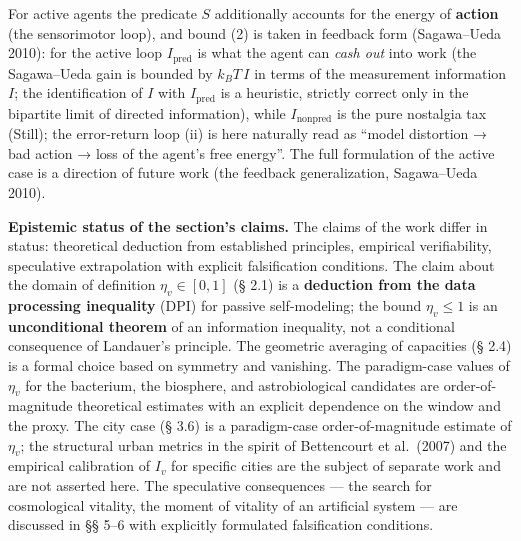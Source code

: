 \documentclass[pdflatex,sn-mathphys-ay]{sn-jnl}
\begin{document}
For active agents the predicate \(S\) additionally accounts for the energy of \textbf{action} (the sensorimotor loop), and bound (2) is taken in feedback form (Sagawa--Ueda 2010): for the active loop \(I_{\text{pred}}\) is what the agent can \emph{cash out} into work (the Sagawa--Ueda gain is bounded by \(k_B T\,I\) in terms of the measurement information \(I\); the identification of \(I\) with \(I_{\text{pred}}\) is a heuristic, strictly correct only in the bipartite limit of directed information), while \(I_{\text{nonpred}}\) is the pure nostalgia tax (Still); the error-return loop (ii) is here naturally read as ``model distortion → bad action → loss of the agent's free energy''. The full formulation of the active case is a direction of future work (the feedback generalization, Sagawa--Ueda 2010).

\textbf{Epistemic status of the section's claims.} The claims of the work differ in status: theoretical deduction from established principles, empirical verifiability, speculative extrapolation with explicit falsification conditions. The claim about the domain of definition \(\eta_v \in [0,1]\) (§ 2.1) is a \textbf{deduction from the data processing inequality} (DPI) for passive self-modeling; the bound \(\eta_v \le 1\) is an \textbf{unconditional theorem} of an information inequality, not a conditional consequence of Landauer's principle. The geometric averaging of capacities (§ 2.4) is a formal choice based on symmetry and vanishing. The paradigm-case values of \(\eta_v\) for the bacterium, the biosphere, and astrobiological candidates are order-of-magnitude theoretical estimates with an explicit dependence on the window and the proxy. The city case (§ 3.6) is a paradigm-case order-of-magnitude estimate of \(\eta_v\); the structural urban metrics in the spirit of Bettencourt et al.~(2007) and the empirical calibration of \(I_v\) for specific cities are the subject of separate work and are not asserted here. The speculative consequences --- the search for cosmological vitality, the moment of vitality of an artificial system --- are discussed in §§ 5--6 with explicitly formulated falsification conditions.
\end{document}
